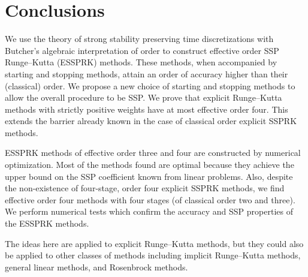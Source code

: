 \section{Conclusions}\label{sec:Conclusion}
We use the theory of strong stability preserving time discretizations
with Butcher's algebraic interpretation of order to construct
effective order SSP Runge--Kutta (ESSPRK) methods. 
These methods, when accompanied by starting and stopping
methods, attain an order of accuracy higher than their (classical) order.
We propose a new choice of starting and stopping methods to allow the
overall procedure to be SSP.
We prove that explicit Runge--Kutta methods with strictly positive 
weights have at most effective order four. 
This extends the barrier already known in the case of classical order
explicit SSPRK methods.

ESSPRK methods of effective order three and four
are constructed by numerical optimization.
Most of the methods found are optimal because they achieve
the upper bound on the SSP coefficient known from linear
problems.
Also, despite the non-existence of four-stage, order four explicit SSPRK methods, 
we find effective order four methods with four stages (of classical 
order two and three). 
We perform numerical tests which confirm the accuracy and
SSP properties of the ESSPRK methods.

The ideas here are applied to explicit Runge--Kutta methods, but they
could also be applied to other classes of methods including implicit
Runge--Kutta methods, general linear methods, and Rosenbrock methods.
